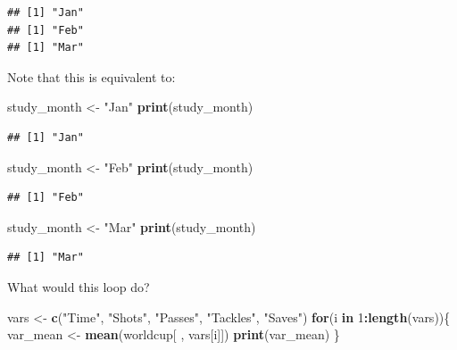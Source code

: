 \documentclass[]{book}
\makeatletter
\newenvironment{Shaded}{\begin{snugshade}}{\end{snugshade}}
\newcommand{\KeywordTok}[1]{\textcolor[rgb]{0.13,0.29,0.53}{\textbf{#1}}}
\newcommand{\DecValTok}[1]{\textcolor[rgb]{0.00,0.00,0.81}{#1}}
\newcommand{\StringTok}[1]{\textcolor[rgb]{0.31,0.60,0.02}{#1}}
\newcommand{\ControlFlowTok}[1]{\textcolor[rgb]{0.13,0.29,0.53}{\textbf{#1}}}
\newcommand{\OperatorTok}[1]{\textcolor[rgb]{0.81,0.36,0.00}{\textbf{#1}}}
\newcommand{\NormalTok}[1]{#1}
\newenvironment{kframe}{%
\medskip{}
\setlength{\fboxsep}{.8em}
 \def\at@end@of@kframe{}%
 \ifinner\ifhmode%
  \def\at@end@of@kframe{\end{minipage}}%
  \begin{minipage}{\columnwidth}%
 \fi\fi%
 \def\FrameCommand##1{\hskip\@totalleftmargin \hskip-\fboxsep
 \colorbox{shadecolor}{##1}\hskip-\fboxsep
     \hskip-\linewidth \hskip-\@totalleftmargin \hskip\columnwidth}%
 \MakeFramed {\advance\hsize-\width
   \@totalleftmargin\z@ \linewidth\hsize
   \@setminipage}}%
 {\par\unskip\endMakeFramed%
 \at@end@of@kframe}
\renewenvironment{Shaded}{\begin{kframe}}{\end{kframe}}
\theoremstyle{definition}
\theoremstyle{definition}
\theoremstyle{definition}
\theoremstyle{remark}
\makeatother
\begin{document}
\begin{verbatim}
## [1] "Jan"
## [1] "Feb"
## [1] "Mar"
\end{verbatim}

Note that this is equivalent to:

\begin{Shaded}
\begin{Highlighting}[]
\NormalTok{study_month <-}\StringTok{ "Jan"}
\KeywordTok{print}\NormalTok{(study_month)}
\end{Highlighting}
\end{Shaded}

\begin{verbatim}
## [1] "Jan"
\end{verbatim}

\begin{Shaded}
\begin{Highlighting}[]
\NormalTok{study_month <-}\StringTok{ "Feb"}
\KeywordTok{print}\NormalTok{(study_month)}
\end{Highlighting}
\end{Shaded}

\begin{verbatim}
## [1] "Feb"
\end{verbatim}

\begin{Shaded}
\begin{Highlighting}[]
\NormalTok{study_month <-}\StringTok{ "Mar"}
\KeywordTok{print}\NormalTok{(study_month)}
\end{Highlighting}
\end{Shaded}

\begin{verbatim}
## [1] "Mar"
\end{verbatim}

What would this loop do?

\begin{Shaded}
\begin{Highlighting}[]
\NormalTok{vars <-}\StringTok{ }\KeywordTok{c}\NormalTok{(}\StringTok{"Time"}\NormalTok{, }\StringTok{"Shots"}\NormalTok{, }\StringTok{"Passes"}\NormalTok{, }\StringTok{"Tackles"}\NormalTok{, }\StringTok{"Saves"}\NormalTok{)}
\ControlFlowTok{for}\NormalTok{(i }\ControlFlowTok{in} \DecValTok{1}\OperatorTok{:}\KeywordTok{length}\NormalTok{(vars))\{}
\NormalTok{        var_mean <-}\StringTok{ }\KeywordTok{mean}\NormalTok{(worldcup[ , vars[i]])}
        \KeywordTok{print}\NormalTok{(var_mean)}
\NormalTok{\}}
\end{Highlighting}
\end{Shaded}
\end{document}
